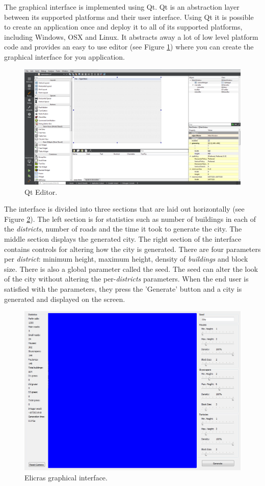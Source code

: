 	\par
	The graphical interface is implemented using Qt\cite{QtWebpage}. Qt is an abstraction layer between its supported platforms and their user interface. Using Qt it is possible to create an application once and deploy it to all of its supported platforms, including Windows, OSX and Linux. It abstracts away a lot of low level platform code and provides an easy to use editor (see Figure \ref{fig:qt-editor}) where you can create the graphical interface for you application\cite{Win32Programming}\cite{QtProgramming}.
		
	\begin{figure}[h]
		\centering
		\includegraphics[width=0.7\linewidth]{"Images/Qt"}
		\caption{Qt Editor.}
		\label{fig:qt-editor}
	\end{figure}
		
	\par
	The interface is divided into three sections that are laid out horizontally (see Figure \ref{fig:elicras-interface}). The left section is for statistics such as number of buildings in each of the \textit{districts}, number of roads and the time it took to generate the city. The middle section displays the generated city. The right section of the interface contains controls for altering how the city is generated. There are four parameters per \textit{district}: minimum height, maximum height, density of \textit{buildings} and block size. There is also a global parameter called the seed. The seed can alter the look of the city without altering the per-\textit{districts} parameters. When the end user is satisfied with the parameters, they press the 'Generate' button and a city is generated and displayed on the screen.
		
	\begin{figure}[h]
		\centering
		\includegraphics[width=0.5\linewidth]{"Images/interface"}
		\caption{Elicras graphical interface.}
		\label{fig:elicras-interface}
	\end{figure}
		
